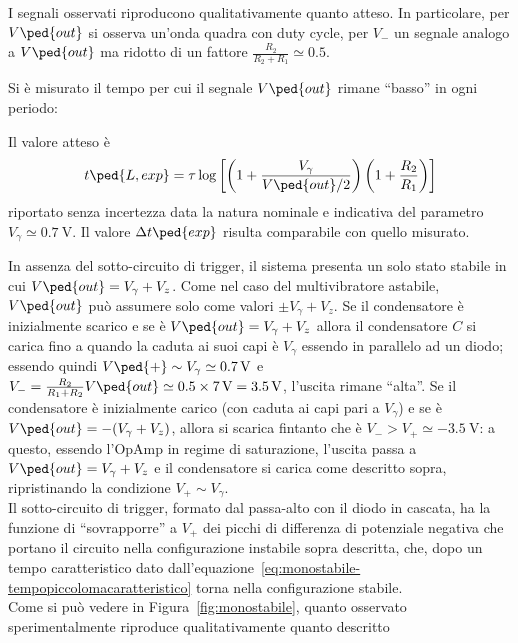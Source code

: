 \documentclass[10pt,a4paper]{article}
\begin{document}
I segnali osservati riproducono qualitativamente quanto atteso.
In particolare, per $ V \ped{out} $ si osserva un'onda quadra con duty cycle,
per $ V_{-} $ un segnale analogo a $ V\ped{out} $ ma ridotto di un fattore
$\frac{R_2}{R_2 + R_1} \simeq 0.5 $.

Si è misurato il tempo per cui il segnale $ V \ped{out} $ rimane ``basso'' in ogni periodo:

Il valore atteso è
\begin{equation} \label{eq: mstable}
t\ped{L, exp} =
\tau \log\left[\left(1 + \frac{V_\gamma}{V \ped{out}/2}\right)
\left(1 + \frac{R_2}{R_1}\right)\right]
\end{equation}
riportato senza incertezza data la natura nominale e indicativa del parametro $ V_{\gamma} \simeq \SI{0.7}{\volt} $. Il valore $ \Delta t \ped{exp} $ risulta comparabile con quello misurato.

In assenza del sotto-circuito di trigger, il sistema presenta un solo stato stabile in cui $ V\ped{out} =  V_{\gamma} + V_{z} $.
Come nel caso del multivibratore astabile, $ V\ped{out} $ può assumere solo come valori $ \pm V_{\gamma} + V_{z} $.
Se il condensatore è inizialmente scarico e se è $ V\ped{out} = V_{\gamma} + V_{z} $ allora il condensatore $ C $ si carica fino a quando la caduta ai suoi capi è $ V_{\gamma} $ essendo in parallelo ad un diodo; essendo quindi $ V\ped{+} \sim V_{\gamma} \simeq \SI{0.7}{\volt} $ e $ V_{-} = \frac{R_{2}}{R_{1} + R_{2}} V\ped{out} \simeq 0.5 \times \SI{7}{\volt} = \SI{3.5}{\volt} $, l'uscita rimane ``alta''.
Se il condensatore è inizialmente carico (con caduta ai capi pari a $ V_{\gamma} $) e se è $ V\ped{out} = -(V_{\gamma} + V_{z}) $, allora si scarica fintanto che è $ V_{-} > V_{+} \simeq -\SI{3.5}{\volt} $: a questo, essendo l'OpAmp in regime di saturazione, l'uscita passa a $ V\ped{out} = V_{\gamma} + V_{z} $ e il condensatore si carica come descritto sopra, ripristinando la condizione $ V_{+} \sim V_{\gamma} $. \\

Il sotto-circuito di trigger, formato dal passa-alto con il diodo in cascata, ha la funzione di ``sovrapporre'' a $ V_{+} $ dei picchi di differenza di potenziale negativa che portano il circuito nella configurazione instabile sopra descritta, che, dopo un tempo caratteristico dato dall'equazione~\eqref{eq:monostabile-tempopiccolomacaratteristico} torna nella configurazione stabile. \\

Come si può vedere in Figura~\ref{fig:monostabile}, quanto osservato sperimentalmente riproduce qualitativamente quanto descritto
\end{document}
